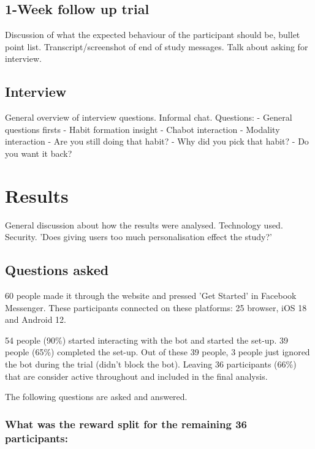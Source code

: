 \subsection{1-Week follow up trial}

Discussion of what the expected behaviour of the participant should be, bullet point list.\newline
Transcript/screenshot of end of study messages.\newline
Talk about asking for interview.

\subsection{Interview}

General overview of interview questions.\newline
Informal chat.\newline
Questions:
  - General questions firsts
  - Habit formation insight
  - Chabot interaction
  - Modality interaction
  - Are you still doing that habit?
  - Why did you pick that habit?
  - Do you want it back?


\section{Results}

General discussion about how the results were analysed. Technology used. Security.\newline
'Does giving users too much personalisation effect the study?'\newline


\subsection{Questions asked}

60 people made it through the website and pressed 'Get Started' in Facebook Messenger. These participants connected on these platforms: 25 browser, iOS 18 and Android 12.


54 people (90\%) started interacting with the bot and started the set-up. 39 people (65\%) completed the set-up. Out of these 39 people, 3 people just ignored the bot during the trial (didn't block the bot). Leaving 36 participants (66\%) that are consider active throughout and included in the final analysis.

The following questions are asked and answered.

\subsubsection*{What was the reward split for the remaining 36 participants:}

